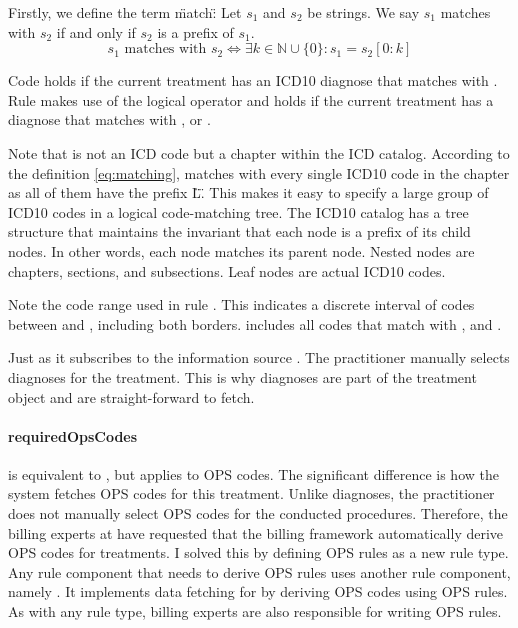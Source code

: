 Firstly, we define the term \"match\":
Let \( s_1 \) and \( s_2 \) be strings.
We say \( s_1 \) matches with \( s_2 \) if and only if \( s_2 \) is a prefix of \( s_1 \).
\begin{equation}
    \label{eq:matching}
    s_1 \text{ matches with } s_2 \iff \exists k \in \mathbb{N} \cup \{0\} : s_1 = s_2[0:k]
\end{equation}

Code  holds if the current treatment has an ICD10 diagnose that matches with .
Rule  makes use of the logical  operator and holds if the current treatment has a diagnose that matches with ,  or .

Note that  is not an ICD code but a chapter within the ICD catalog.
According to the definition \ref{eq:matching},  matches with every single ICD10 code in the  chapter as all of them have the prefix \"L\".
This makes it easy to specify a large group of ICD10 codes in a logical code-matching tree.
The ICD10 catalog has a tree structure that maintains the invariant that each node is a prefix of its child nodes.
In other words, each node matches its parent node.
Nested nodes are chapters, sections, and subsections.
Leaf nodes are actual ICD10 codes.

Note the code range  used in rule .
This indicates a discrete interval of codes between  and , including both borders.
 includes all codes that match with ,  and .

Just as  it subscribes to the information source .
The practitioner manually selects diagnoses for the treatment.
This is why diagnoses are part of the treatment object and are straight-forward to fetch.

\paragraph{requiredOpsCodes}
 is equivalent to , but applies to OPS codes.
The significant difference is how the system fetches OPS codes for this treatment.
Unlike diagnoses, the practitioner does not manually select OPS codes for the conducted procedures.
Therefore, the billing experts at \AV have requested that the billing framework automatically derive OPS codes for treatments.
I solved this by defining OPS rules as a new rule type.
Any rule component that needs to derive OPS rules uses another rule component, namely .
It implements data fetching for  by deriving OPS codes using OPS rules.
As with any rule type, billing experts are also responsible for writing OPS rules.

